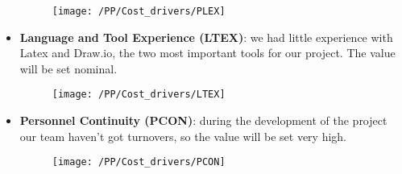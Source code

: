 \begin{itemize}
    \begin{figure}[!ht]
      \centering
      \vspace{0.2cm}
      \texttt{[image: /PP/Cost\_drivers/PLEX]}\\
      \vspace{0.2cm}
      \label{fig:PLEX} 
    \end{figure}  
    \item \textbf{Language and Tool Experience (LTEX)}: we had little experience with Latex and Draw.io, the two most important tools for our project. The value will be set nominal. 
    \begin{figure}[!ht]
      \centering
      \vspace{0.2cm}
      \texttt{[image: /PP/Cost\_drivers/LTEX]}\\
      \vspace{0.2cm}
      \label{fig:LTEX} 
    \end{figure}  
    \item \textbf{Personnel Continuity (PCON)}: during the development of the project our team haven't got turnovers, so the value will be set very high.
    \begin{figure}[!ht]
      \centering
      \vspace{0.2cm}
      \texttt{[image: /PP/Cost\_drivers/PCON]}\\
      \vspace{0.2cm}
      \label{fig:PCON} 
    \end{figure}  
\end{itemize}


